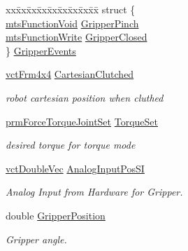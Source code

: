 \begin{DoxyCompactItemize}
\item 
\begin{tabbing}
xx\=xx\=xx\=xx\=xx\=xx\=xx\=xx\=xx\=\kill
struct \{\\
\>\hyperlink{classmts_function_void}{mtsFunctionVoid} \hyperlink{classmts_intuitive_research_kit_m_t_m_acf5b18a7bb385172688a4f8fafcc24d7}{GripperPinch}\\
\>\hyperlink{classmts_function_write}{mtsFunctionWrite} \hyperlink{classmts_intuitive_research_kit_m_t_m_ac2406f66a4880a35ef854e85843d4c8e}{GripperClosed}\\
\} \hyperlink{classmts_intuitive_research_kit_m_t_m_a30da23b813dd39d85594e36caecafce3}{GripperEvents}\\

\end{tabbing}\item 
\hyperlink{vct_transformation_types_8h_a33da47f4deb2556b37a69a2c44b29d75}{vct\-Frm4x4} \hyperlink{classmts_intuitive_research_kit_m_t_m_ad598efcb1d63152196891659bce6b4bf}{Cartesian\-Clutched}
\begin{DoxyCompactList}\small\item\em robot cartesian position when cluthed \end{DoxyCompactList}\item 
\hyperlink{classprm_force_torque_joint_set}{prm\-Force\-Torque\-Joint\-Set} \hyperlink{classmts_intuitive_research_kit_m_t_m_a78cce153418a304d9be36458e2252c4f}{Torque\-Set}
\begin{DoxyCompactList}\small\item\em desired torque for torque mode \end{DoxyCompactList}\item 
\hyperlink{vct_dynamic_vector_types_8h_ade4b3068c86fb88f41af2e5187e491c2}{vct\-Double\-Vec} \hyperlink{classmts_intuitive_research_kit_m_t_m_ae18a768f2aad718e26109dd1856489fd}{Analog\-Input\-Pos\-S\-I}
\begin{DoxyCompactList}\small\item\em Analog Input from Hardware for Gripper. \end{DoxyCompactList}\item 
double \hyperlink{classmts_intuitive_research_kit_m_t_m_a5daa7ff2d7390d64d1246c39609fbff2}{Gripper\-Position}
\begin{DoxyCompactList}\small\item\em Gripper angle. \end{DoxyCompactList}\item 

\end{DoxyCompactItemize}
